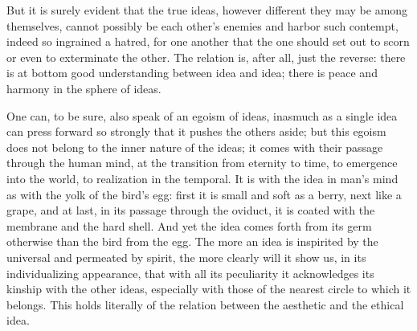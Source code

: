 \documentclass[12pt,a4paper,openany]{book}
\begin{document}
But it is surely evident that the true ideas, however different they may be among themselves, cannot possibly be each other's enemies and harbor such contempt, indeed so ingrained a hatred, for one another that the one should set out to scorn or even to exterminate the other. The relation is, after all, just the reverse: there is at bottom good understanding between idea and idea; there is peace and harmony in the sphere of ideas.

One can, to be sure, also speak of an egoism of ideas, inasmuch as a single idea can press forward so strongly that it pushes the others aside; but this egoism does not belong to the inner nature of the ideas; it comes with their passage through the human mind, at the transition from eternity to time, to emergence into the world, to realization in the temporal. It is with the idea in man's mind as with the yolk of the bird's egg: first it is small and soft as a berry, next like a grape, and at last, in its passage through the oviduct, it is coated with the membrane and the hard shell. And yet the idea comes forth from its germ otherwise than the bird from the egg. The more an idea is inspirited by the universal and permeated by spirit, the more clearly will it show us, in its individualizing appearance, that with all its peculiarity it acknowledges its kinship with the other ideas, especially with those of the nearest circle to which it belongs. This holds literally of the relation between the aesthetic and the ethical idea.
\end{document}
